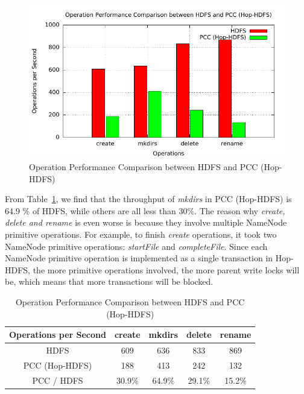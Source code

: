 \begin{figure}[h]
	\centering
	\includegraphics[width=\linewidth]{figs/nn_100.pdf}
	\caption{Operation Performance Comparison between HDFS and PCC (Hop-HDFS)}
	\label{fig:nntp}
\end{figure}

\noindent From Table~\ref{table:nntpb}, we find that the throughput of \textit{mkdirs} in PCC (Hop-HDFS) is 64.9 \% of HDFS, while others are all less than 30\%. The reason why \textit{create, delete and rename} is even worse is because they involve multiple NameNode primitive operations. For example, to finish \textit{create} operations, it took two NameNode primitive operations: \textit{startFile} and \textit{completeFile}. Since each NameNode primitive operation is implemented as a single transaction in Hop-HDFS, the more primitive operations involved, the more parent write locks will be, which means that more transactions will be blocked.
\begin{table}[h]
	\centering
	\begin{tabular}{|c|c|c|c|c|}
		\hline
		\textbf{Operations per Second} & \textbf{create} & \textbf{mkdirs} & \textbf{delete} & \textbf{rename} \\ \hline
		HDFS                           & 609             & 636             & 833             & 869             \\ \hline
		PCC (Hop-HDFS)                 & 188             & 413             & 242             & 132             \\ \hline
		PCC / HDFS              & 30.9\%          & 64.9\%          & 29.1\%          & 15.2\%          \\ \hline
	\end{tabular}
	\caption{Operation Performance Comparison between HDFS and PCC (Hop-HDFS)}
	\label{table:nntpb}
\end{table}

